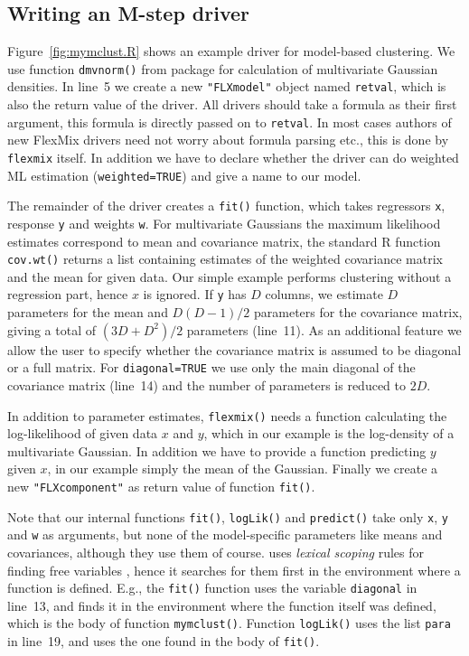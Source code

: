 \documentclass{jss}
\newcommand{\R}{\proglang{R}}
\begin{document}
\subsection{Writing an M-step driver}
\label{sec:writing-an-m}

Figure~\ref{fig:mymclust.R} shows an example driver for model-based
clustering. We use function \texttt{dmvnorm()} from package
 for calculation of multivariate Gaussian densities.
In line~5 we create a new \texttt{"FLXmodel"} object named \texttt{retval},
which is also the return value of the driver.  All drivers should take
a formula as their first argument, this formula is directly passed on to
\texttt{retval}. In most cases authors of new FlexMix drivers need not
worry about formula parsing etc., this is done by \texttt{flexmix}
itself. In addition we have to declare whether the driver can do
weighted ML estimation (\texttt{weighted=TRUE}) and give a name to our
model.

The remainder of the driver creates a \texttt{fit()} function, which
takes regressors \texttt{x}, response \texttt{y} and weights
\texttt{w}. For multivariate Gaussians the maximum likelihood
estimates correspond to mean and covariance matrix, the standard R
function \texttt{cov.wt()} returns a list containing estimates of the
weighted covariance matrix and the mean for given data. Our simple
example performs clustering without a regression part, hence $x$ is
ignored. If \texttt{y} has $D$ columns, we estimate $D$ parameters for
the mean and $D(D-1)/2$ parameters for the covariance matrix, giving a
total of $(3D+D^2)/2$ parameters (line~11).  As an additional feature
we allow the user to specify whether the covariance matrix is assumed
to be diagonal or a full matrix. For \texttt{diagonal=TRUE} we use
only the main diagonal of the covariance matrix (line~14) and the
number of parameters is reduced to $2D$.

In addition to parameter estimates, \texttt{flexmix()} needs a function
calculating the log-likelihood of given data $x$ and $y$, which in our
example is the log-density of a multivariate Gaussian. In addition we
have to provide a function predicting $y$ given $x$, in our example
simply the mean of the Gaussian. Finally we create a new
\texttt{"FLXcomponent"} as return value of function \texttt{fit()}.

Note that our internal functions \texttt{fit()}, \texttt{logLik()} and
\texttt{predict()} take only \texttt{x}, \texttt{y} and \texttt{w} as
arguments, but none of the model-specific parameters like means and
covariances, although they use them of course. \R{} uses \emph{lexical
  scoping} rules for finding free variables
\citep{fla:Gentleman+Ihaka:2000}, hence it searches for them first in
the environment where a function is defined. E.g., the \texttt{fit()}
function uses the variable \texttt{diagonal} in line~13, and finds it
in the environment where the function itself was defined, which is the
body of function \texttt{mymclust()}. Function \texttt{logLik()} uses
the list \texttt{para} in line~19, and uses the one found in the
body of \texttt{fit()}.
\end{document}
